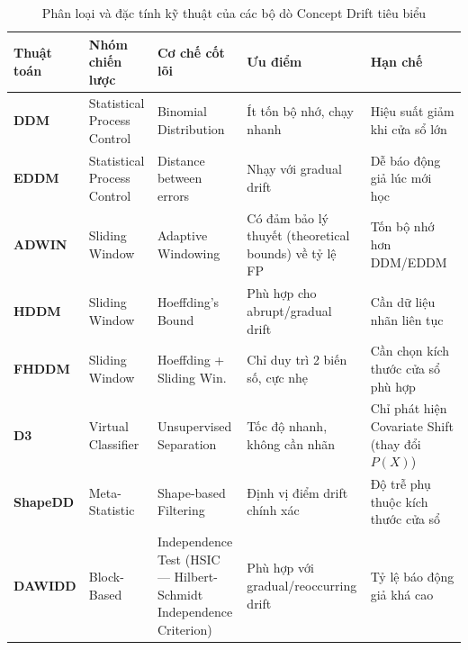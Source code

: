 \begin{table}[H]
	\centering
	\caption{Phân loại và đặc tính kỹ thuật của các bộ dò Concept Drift tiêu biểu}
	\label{tab:algorithm_taxonomy}
	\footnotesize
	\begin{tabular}{@{}lp{2.8cm}p{2.5cm}p{3cm}p{3cm}@{}}
		\toprule
		\textbf{Thuật toán} & \textbf{Nhóm chiến lược}    & \textbf{Cơ chế cốt lõi}  & \textbf{Ưu điểm}                                              & \textbf{Hạn chế}                                                         \\
		\midrule
		\textbf{DDM}        & Statistical Process Control & Binomial Distribution    & Ít tốn bộ nhớ, chạy nhanh~\cite{gama2004learning}             & Hiệu suất giảm khi cửa sổ lớn~\cite{hinder2024survey_partA}              \\
		\addlinespace
		\textbf{EDDM}       & Statistical Process Control & Distance between errors  & Nhạy với gradual drift~\cite{baena2006early}                  & Dễ báo động giả lúc mới học~\cite{hovakimyan2024evolving}                    \\
		\addlinespace
		\textbf{ADWIN}      & Sliding Window              & Adaptive Windowing       & Có đảm bảo lý thuyết (theoretical bounds) về tỷ lệ FP~\cite{bifet2007learning}      & Tốn bộ nhớ hơn DDM/EDDM~\cite{hinder2024survey_partA}                    \\
		\addlinespace
		\textbf{HDDM}       & Sliding Window              & Hoeffding's Bound        & Phù hợp cho abrupt/gradual drift~\cite{friasblanco2015hddm}   & Cần dữ liệu nhãn liên tục~\cite{hovakimyan2024evolving}                      \\
		\addlinespace
		\textbf{FHDDM}      & Sliding Window              & Hoeffding + Sliding Win. & Chỉ duy trì 2 biến số, cực nhẹ~\cite{pesaranghader2016fhddm}  & Cần chọn kích thước cửa sổ phù hợp~\cite{hinder2024survey_partA}         \\
		\addlinespace
		\textbf{D3}         & Virtual Classifier          & Unsupervised Separation  & Tốc độ nhanh, không cần nhãn~\cite{gozuacik2019d3}            & Chỉ phát hiện Covariate Shift (thay đổi $P(X)$)~\cite{hinder2024survey_partA} \\
		\addlinespace
		\textbf{ShapeDD}    & Meta-Statistic              & Shape-based Filtering    & Định vị điểm drift chính xác~\cite{shapeDD2021}             & Độ trễ phụ thuộc kích thước cửa sổ~\cite{shapeDD2021}                    \\
		\addlinespace
		\textbf{DAWIDD}     & Block-Based                 & Independence Test (HSIC --- Hilbert-Schmidt Independence Criterion) & Phù hợp với gradual/reoccurring drift~\cite{hinder2020dawidd} & Tỷ lệ báo động giả khá cao~\cite{hinder2024survey_partA}                 \\
		\bottomrule
	\end{tabular}
\end{table}

